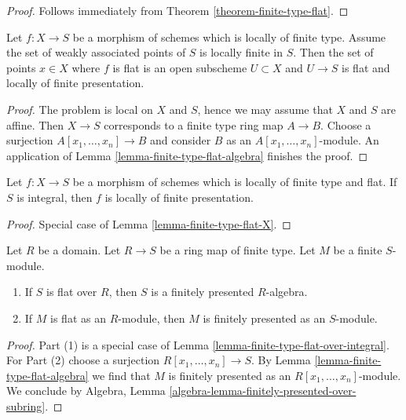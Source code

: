 \begin{proof}
Follows immediately from
Theorem \ref{theorem-finite-type-flat}.
\end{proof}

\begin{lemma}
\label{lemma-finite-type-flat-X}
Let $f : X \to S$ be a morphism of schemes which is locally of finite
type. Assume the set of weakly associated points of $S$ is locally finite
in $S$. Then the set of points $x \in X$ where $f$ is flat is an open
subscheme $U \subset X$ and $U \to S$ is flat and locally of finite
presentation.
\end{lemma}

\begin{proof}
The problem is local on $X$ and $S$, hence we may assume that
$X$ and $S$ are affine. Then $X \to S$ corresponds to a finite type
ring map $A \to B$. Choose a surjection $A[x_1, \ldots, x_n] \to B$
and consider $B$ as an $A[x_1, \ldots, x_n]$-module. An application of
Lemma \ref{lemma-finite-type-flat-algebra}
finishes the proof.
\end{proof}

\begin{lemma}
\label{lemma-finite-type-flat-over-integral}
Let $f : X \to S$ be a morphism of schemes which is
locally of finite type and flat. If $S$ is integral, then $f$
is locally of finite presentation.
\end{lemma}

\begin{proof}
Special case of
Lemma \ref{lemma-finite-type-flat-X}.
\end{proof}

\begin{proposition}
\label{proposition-flat-finite-type-finite-presentation-domain}
Let $R$ be a domain. Let $R \to S$ be a ring map of finite type.
Let $M$ be a finite $S$-module.
\begin{enumerate}
\item If $S$ is flat over $R$, then $S$ is a finitely presented $R$-algebra.
\item If $M$ is flat as an $R$-module, then $M$ is finitely presented
as an $S$-module.
\end{enumerate}
\end{proposition}

\begin{proof}
Part (1) is a special case of
Lemma \ref{lemma-finite-type-flat-over-integral}.
For Part (2) choose a surjection $R[x_1, \ldots, x_n] \to S$.
By Lemma \ref{lemma-finite-type-flat-algebra} we find that $M$
is finitely presented as an $R[x_1, \ldots, x_n]$-module.
We conclude by Algebra, Lemma
\ref{algebra-lemma-finitely-presented-over-subring}.
\end{proof}

